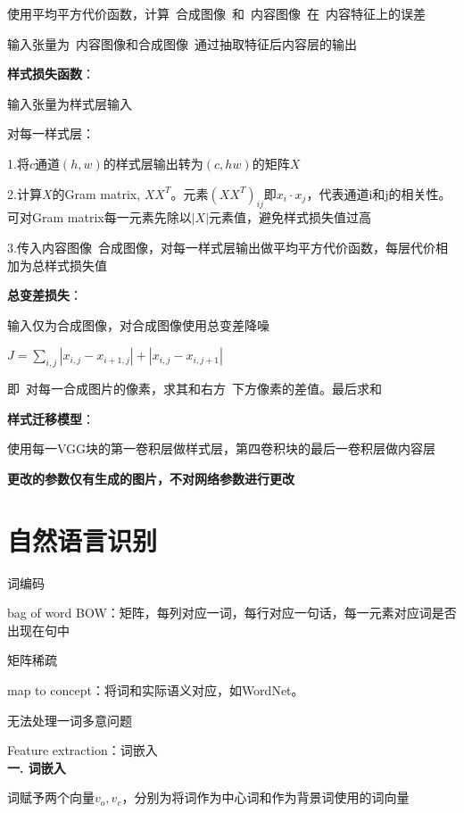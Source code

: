 \documentclass[UTF8]{ctexart}
\begin{document}
  \quad \quad 使用平均平方代价函数，计算\ 合成图像\ 和\ 内容图像\ 在\ 内容特征上的误差

  \quad \quad 输入张量为\ 内容图像和合成图像\ 通过抽取特征后内容层的输出

  \quad \textbf{样式损失函数}：

  \quad \quad 输入张量为样式层输入

  \quad \quad 对每一样式层：

  \quad \quad \quad 1.将$c$通道$(h, w)$的样式层输出转为$(c, hw)$的矩阵$X$

  \quad \quad \quad 2.计算$X$的Gram matrix, $XX^T$。元素$(XX^T)_{ij}$即$x_i \cdot x_j$，代表通道i和j的相关性。可对Gram matrix每一元素先除以$|X|$元素值，避免样式损失值过高

  \quad \quad \quad 3.传入内容图像\ 合成图像，对每一样式层输出做平均平方代价函数，每层代价相加为总样式损失值

  \quad \textbf{总变差损失}：

  \quad \quad 输入仅为合成图像，对合成图像使用总变差降噪

  \quad \quad $J = \sum_{i, j} |x_{i,j} - x_{i+1,j}| + |x_{i,j} - x_{i,j+1}|$

  \quad \quad \quad 即\ 对每一合成图片的像素，求其和右方\ 下方像素的差值。最后求和

  \textbf{样式迁移模型}：

  \quad 使用每一VGG块的第一卷积层做样式层，第四卷积块的最后一卷积层做内容层
  
  \quad \textbf{更改的参数仅有生成的图片，不对网络参数进行更改}

\section{自然语言识别}
\noindent 词编码

  bag of word BOW：矩阵，每列对应一词，每行对应一句话，每一元素对应词是否出现在句中

  \quad 矩阵稀疏

  map to concept：将词和实际语义对应，如WordNet。

  \quad 无法处理一词多意问题

  Feature extraction：词嵌入\\
\textbf{一. 词嵌入}

  词赋予两个向量$v_o, v_c$，分别为将词作为中心词和作为背景词使用的词向量
  
\end{document}
